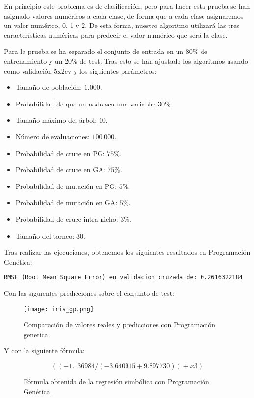 En principio este problema es de clasificación, pero para hacer esta prueba se han asignado valores numéricos a cada clase, de forma que a cada clase asignaremos un valor numérico, 0, 1 y 2. De esta forma, nuestro algoritmo utilizará las tres características numéricas para predecir el valor numérico que será la clase.


Para la prueba se ha separado el conjunto de entrada en un 80\% de entrenamiento y un 20\% de test. Tras esto se han ajustado los algoritmos usando como validación 5x2cv y los siguientes parámetros:

\begin{itemize}
	\item Tamaño de población: $1.000$.
	\item Probabilidad de que un nodo sea una variable: $30\%$.
	\item Tamaño máximo del árbol: $10$.
	\item Número de evaluaciones: $100.000$.
	\item Probabilidad de cruce en PG: $75\%$.
	\item Probabilidad de cruce en GA: $75\%$.
	\item Probabilidad de mutación en PG: $5\%$.
	\item Probabilidad de mutación en GA: $5\%$.
	\item Probabilidad de cruce intra-nicho: $3\%$.
	\item Tamaño del torneo: $30$.
\end{itemize}

Tras realizar las ejecuciones, obtenemos los siguientes resultados en Programación Genética:

\begin{lstlisting}
RMSE (Root Mean Square Error) en validacion cruzada de: 0.2616322184
\end{lstlisting}

Con las siguientes predicciones sobre el conjunto de test:

\begin{figure}[H]
	 \centering
	 \texttt{[image: iris\_gp.png]}
	 \caption{Comparación de valores reales y predicciones con Programación genetica.}
	\label{fig:iris_gp}
\end{figure}

Y con la siguiente fórmula:

\begin{figure}[H]
	 \centering
	 $$( ( -1.136984  / ( -3.640915  +  9.897730 ) ) +  x3 )$$
	 \caption{Fórmula obtenida de la regresión simbólica con Programación Genética.}
	\label{fig:formula_iris_gp}
\end{figure}

